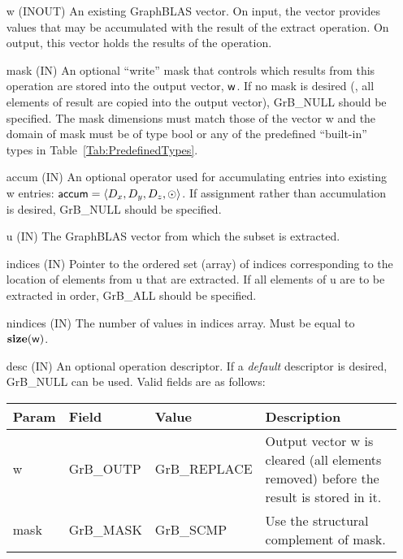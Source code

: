 \begin{itemize}[leftmargin=1in]
    \item[{\sf w}]    ({\sf INOUT}) An existing GraphBLAS vector.  On input,
    the vector provides values that may be accumulated with the result of the
    extract operation.  On output, this vector holds the results of the
    operation.

    \item[{\sf mask}]  ({\sf IN}) An optional ``write'' mask that controls which
    results from this operation are stored into the output vector,
    ${\sf w}$.  If no mask is desired (\ie, all elements
    of result are copied into the output vector), {\sf GrB\_NULL}
    should be specified. The mask dimensions must match those of the
    vector {\sf w} and the domain of {\sf mask} must be
    of type {\sf bool} or any of the predefined ``built-in'' types in
    Table~\ref{Tab:PredefinedTypes}.

    \item[{\sf accum}]    ({\sf IN}) An optional operator used for accumulating
    entries into existing {\sf w} entries: ${\sf accum} = \langle D_x,
    D_y, D_z,\odot \rangle$. If assignment rather than accumulation is
    desired, {\sf GrB\_NULL} should be specified.

    \item[{\sf u}]       ({\sf IN}) The GraphBLAS vector from which the subset
    is extracted.
    
    \item[{\sf indices}]  ({\sf IN}) Pointer to the ordered set (array) of 
    indices corresponding to the location of elements from {\sf u} that are 
    extracted.  If all elements of {\sf u} are to be extracted in order, 
    {\sf GrB\_ALL} should be specified.
    
    \item[{\sf nindices}] ({\sf IN}) The number of values in {\sf indices} array.
    Must be equal to $\bold{size}({\sf w})$.

    \item[{\sf desc}]     ({\sf IN}) An optional operation descriptor.  If a 
    \emph{default} descriptor is desired, {\sf GrB\_NULL} can be used.  Valid 
    fields are as follows: \\
    
    \begin{tabular}{lllp{2.5in}}
        Param & Field  & Value & Description \\
        \hline
        {\sf w}    & {\sf GrB\_OUTP} & {\sf GrB\_REPLACE} & Output vector {\sf w}
        is cleared (all elements removed) before the result is stored in it. \\
        
        {\sf mask} & {\sf GrB\_MASK} & {\sf GrB\_SCMP}   & Use the structural 
        complement of {\sf mask}. \\
    \end{tabular}
\end{itemize}

